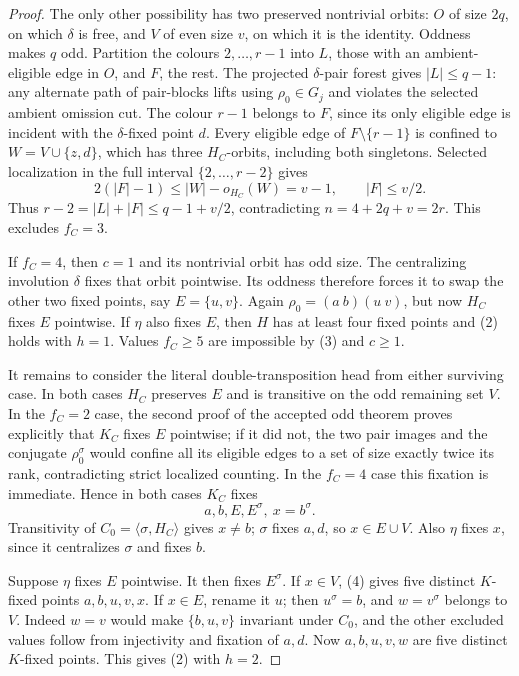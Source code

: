 \documentclass[11pt,a4paper]{article}
\newcommand{\gen}[1]{\langle#1\rangle}
\begin{document}
\begin{proof}
The only other possibility has two preserved nontrivial orbits:
$O$ of size $2q$, on which $\delta$ is free, and $V$ of even
size $v$, on which it is the identity. Oddness makes $q$ odd.
Partition the colours $2,\ldots,r-1$ into $L$, those with an
ambient-eligible edge in $O$, and $F$, the rest. The projected
$\delta$-pair forest gives $|L|\le q-1$: any alternate path of
pair-blocks lifts using $\rho_0\in G_j$ and violates the selected
ambient omission cut. The colour $r-1$ belongs to $F$, since its
only eligible edge is incident with the $\delta$-fixed point $d$.
Every eligible edge of $F\setminus\{r-1\}$ is confined to
$W=V\cup\{z,d\}$, which has three $H_C$-orbits, including both
singletons. Selected localization in the full interval
$\{2,\ldots,r-2\}$ gives
\[
 2(|F|-1)\le |W|-o_{H_C}(W)=v-1,
 \qquad |F|\le v/2.
\]
Thus $r-2=|L|+|F|\le q-1+v/2$, contradicting
$n=4+2q+v=2r$. This excludes $f_C=3$.

If $f_C=4$, then $c=1$ and its nontrivial orbit has odd size.
The centralizing involution $\delta$ fixes that orbit pointwise.
Its oddness therefore forces it to swap the other two fixed points,
say $E=\{u,v\}$. Again $\rho_0=(a\ b)(u\ v)$, but now $H_C$
fixes $E$ pointwise. If $\eta$ also fixes $E$, then $H$ has at
least four fixed points and (2) holds with $h=1$.
Values $f_C\ge5$ are impossible by (3) and $c\ge1$.

It remains to consider the literal double-transposition head from
either surviving case. In both cases $H_C$ preserves $E$ and is
transitive on the odd remaining set $V$. In the $f_C=2$ case,
the second proof of the accepted odd theorem proves explicitly
that $K_C$ fixes $E$ pointwise; if it did not, the two pair images
and the conjugate $\rho_0^\sigma$ would confine all its eligible
edges to a set of size exactly twice its rank, contradicting strict
localized counting. In the $f_C=4$ case this fixation is immediate.
Hence in both cases $K_C$ fixes
\[
                         a,b,E,E^\sigma,\ x=b^\sigma.   \tag{4}
\]
Transitivity of $C_0=\gen{\sigma,H_C}$ gives $x\ne b$;
$\sigma$ fixes $a,d$, so $x\in E\cup V$.
Also $\eta$ fixes $x$, since it centralizes $\sigma$ and fixes $b$.

Suppose $\eta$ fixes $E$ pointwise. It then fixes $E^\sigma$.
If $x\in V$, (4) gives five distinct $K$-fixed points
$a,b,u,v,x$. If $x\in E$, rename it $u$; then $u^\sigma=b$,
and $w=v^\sigma$ belongs to $V$. Indeed $w=v$ would make
$\{b,u,v\}$ invariant under $C_0$, and the other excluded values
follow from injectivity and fixation of $a,d$.
Now $a,b,u,v,w$ are five distinct $K$-fixed points.
This gives (2) with $h=2$.


\end{proof}
\end{document}
